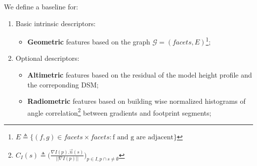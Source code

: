 \documentclass[portrait, a0paper, margin=.5cm]{baposter}
\begin{document}
\begin{poster}



        {
            We define a baseline for:
            \begin{enumerate}[label = (\roman*)., font=\color{black}, itemsep=15pt]
                \item Basic intrinsic descriptors:
                \begin{itemize}[label=$\blacktriangleright$, font=\color{IGNGreen}]
                    \item \textbf{Geometric} features based on the graph $\mathscr{G}=(facets, E)$\footnote{$E \triangleq \{(f, g) \in facets \times facets: \text{f and g are adjacent}\}$};
                \end{itemize}
                \item Optional descriptors:
                \begin{itemize}[label=$\blacktriangleright$, font=\color{blue}, itemsep=10pt]
                    \item \textbf{Altimetric} features based on the residual of the model height profile and the correponding DSM\@;
                    \item \textbf{Radiometric} features based on building wise normalized histograms of angle correlation\footnote{$C_I(s) \triangleq \Big(\frac{\nabla I(p) . \vec{n}(s)}{\vert\vert\nabla I(p)\vert\vert}\Big)_{p \in I, p \cap s \neq \emptyset}$} between gradients and footprint segments;
                \end{itemize}
            \end{enumerate}
        }


\end{poster}
\end{document}
